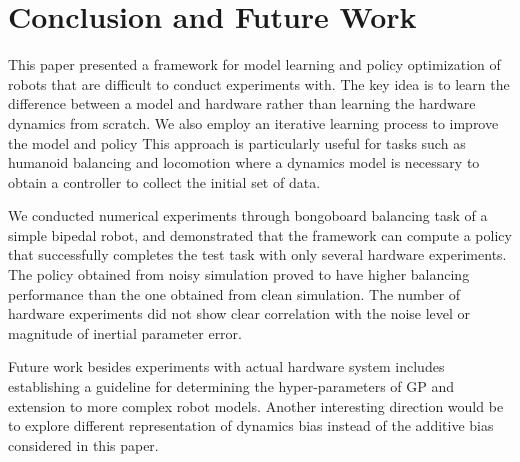 \section{Conclusion and Future Work}  \label{sec:learning_conclusion}

This paper presented a framework for model learning and policy
optimization of robots that are difficult to conduct experiments with.
The key idea is to learn the difference between a model and hardware
rather than learning the hardware dynamics from scratch.
We also employ an iterative learning process to improve the model and
policy 
This approach is particularly useful for tasks such as humanoid
balancing and locomotion where a dynamics model is necessary to obtain a
controller to collect the initial set of data.

We conducted numerical experiments through bongoboard balancing task of
a simple bipedal robot, and demonstrated that the framework can compute
a policy that successfully completes the test task with only several
hardware experiments.
The policy obtained from noisy simulation proved to have higher
balancing performance than the one obtained from clean simulation.
The number of hardware experiments did not show clear correlation with the
noise level or magnitude of inertial parameter error.

Future work besides experiments with actual hardware system includes
establishing a guideline for determining the hyper-parameters of GP and
extension to more complex robot models.
Another interesting direction would be to explore different
representation of dynamics bias instead of the additive bias considered
in this paper. 

